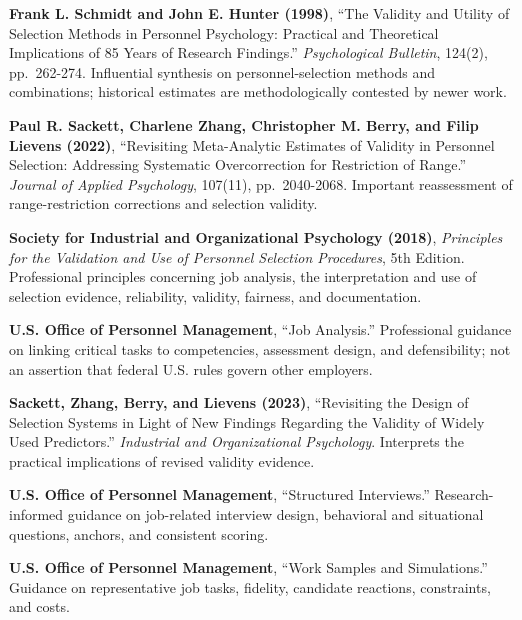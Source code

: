 \begin{enumerate}[leftmargin=*,label={[\textbf{R\arabic*}]}]
\item \textbf{Frank L. Schmidt and John E. Hunter (1998)}, ``The Validity and Utility of Selection Methods in Personnel Psychology: Practical and Theoretical Implications of 85 Years of Research Findings.'' \textit{Psychological Bulletin}, 124(2), pp.~262-274. Influential synthesis on personnel-selection methods and combinations; historical estimates are methodologically contested by newer work.

\item \textbf{Paul R. Sackett, Charlene Zhang, Christopher M. Berry, and Filip Lievens (2022)}, ``Revisiting Meta-Analytic Estimates of Validity in Personnel Selection: Addressing Systematic Overcorrection for Restriction of Range.'' \textit{Journal of Applied Psychology}, 107(11), pp.~2040-2068. Important reassessment of range-restriction corrections and selection validity.

\item \textbf{Society for Industrial and Organizational Psychology (2018)}, \textit{Principles for the Validation and Use of Personnel Selection Procedures}, 5th Edition. Professional principles concerning job analysis, the interpretation and use of selection evidence, reliability, validity, fairness, and documentation.

\item \textbf{U.S. Office of Personnel Management}, ``Job Analysis.'' Professional guidance on linking critical tasks to competencies, assessment design, and defensibility; not an assertion that federal U.S. rules govern other employers.

\item \textbf{Sackett, Zhang, Berry, and Lievens (2023)}, ``Revisiting the Design of Selection Systems in Light of New Findings Regarding the Validity of Widely Used Predictors.'' \textit{Industrial and Organizational Psychology}. Interprets the practical implications of revised validity evidence.

\item \textbf{U.S. Office of Personnel Management}, ``Structured Interviews.'' Research-informed guidance on job-related interview design, behavioral and situational questions, anchors, and consistent scoring.

\item \textbf{U.S. Office of Personnel Management}, ``Work Samples and Simulations.'' Guidance on representative job tasks, fidelity, candidate reactions, constraints, and costs.


\end{enumerate}
